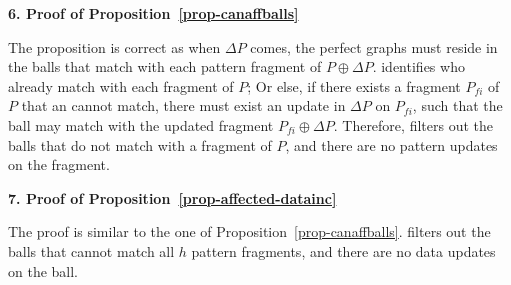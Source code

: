 
\noindent
{\textbf{6. Proof of Proposition~\ref{prop-canaffballs}}}

The proposition is correct as when $\Delta P$ comes, the perfect graphs must reside in the balls that match with each pattern fragment of $P\oplus \Delta P$.
\identifyaffball identifies \affballsx who already match with each fragment of $P$;
Or else, if there exists a fragment $P_{fi}$ of $P$ that an \affballx cannot match,
there must exist an update in $\Delta P$ on $P_{fi}$,
such that the ball may match with the updated fragment $P_{fi}\oplus \Delta P$.
Therefore, \identifyaffball filters out the balls that do not match with a fragment of $P$, and there are no pattern updates on the fragment.

\noindent
{\textbf{7. Proof of Proposition~\ref{prop-affected-datainc}}}
	
The proof is similar to the one of Proposition~\ref{prop-canaffballs}.
\identifyaffball filters out the balls that cannot match all $h$ pattern fragments,	and there are no data updates on the ball.


